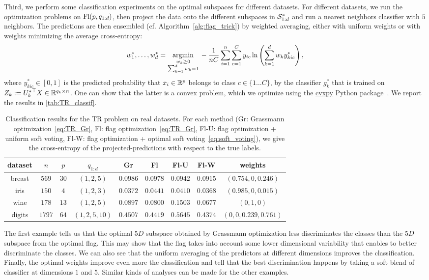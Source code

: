 Third, we perform some classification experiments on the optimal subspaces for different datasets. For different datasets, we run the optimization problems on $\Fl(p, q_{1:d})$, then project the data onto the different subspaces in $\S_{1:d}^*$ and run a nearest neighbors classifier with $5$ neighbors.
The predictions are then ensembled (cf. Algorithm~\ref{alg:flag_trick}) by weighted averaging, either with uniform weights or with weights minimizing the average cross-entropy:
\begin{equation}\label{eq:soft_voting}
	w_1^*, \dots, w_d^* = \argmin{\substack{w_k \geq 0 \\ \sum_{k=1}^d w_k = 1}} - \frac 1 {n C} \sum_{i=1}^n \sum_{c=1}^C y_{ic} \ln\lrp{\sum_{k=1}^d w_k y_{kic}^*},
\end{equation}
where $y_{kic}^* \in [0, 1]$ is the predicted probability that $x_i \in \R^p$ belongs to class $c \in \{1 \dots C\}$, by the classifier $g_k^*$ that is trained on $Z_k := {U_k^*}\T X \in \R^{q_k \times n}$. One can show that the latter is a convex problem, which we optimize using the \href{https://www.cvxpy.org/index.html}{cvxpy} Python package~\citep{diamond2016cvxpy}.
We report the results in \autoref{tab:TR_classif}.
\begin{table}
  \caption{Classification results for the TR problem on real datasets. For each method (Gr: Grassmann optimization~\eqref{eq:TR_Gr}, Fl: flag optimization~\eqref{eq:TR_Gr}, Fl-U: flag optimization + uniform soft voting, Fl-W: flag optimization + optimal soft voting~\eqref{eq:soft_voting}), we give the cross-entropy of the projected-predictions with respect to the true labels.}
  \label{tab:TR_classif}
  \centering
  \begin{tabular}{ccccccccc}
    \toprule
    dataset & $n$ & $p$ & $q_{1:d}$ & Gr & Fl & Fl-U & Fl-W & weights\\
    \midrule
    breast & $569$ & $30$ & $(1, 2, 5)$ & $0.0986$ & $0.0978$ & $0.0942$ & $0.0915$ & $(0.754, 0, 0.246)$\\
    iris & $150$ & $4$ & $(1, 2, 3)$ & $0.0372$ & $0.0441$ & $0.0410$ & $0.0368$ & $(0.985, 0, 0.015)$\\
    wine & $178$ & $13$ & $(1, 2, 5)$ & $0.0897$ & $0.0800$ & $0.1503$ & $0.0677$ & $(0, 1, 0)$\\
    digits & $1797$ & $64$ & $(1, 2, 5, 10)$ & $0.4507$ & $0.4419$ & $0.5645$ & $0.4374$ & $(0, 0, 0.239, 0.761)$\\
    \bottomrule
  \end{tabular}
\end{table}
The first example tells us that the optimal $5D$ subspace obtained by Grassmann optimization less discriminates the classes than the $5D$ subspace from the optimal flag. This may show that the flag takes into account some lower dimensional variability that enables to better discriminate the classes. We can also see that the uniform averaging of the predictors at different dimensions improves the classification. Finally, the optimal weights improve even more the classification and tell that the best discrimination happens by taking a soft blend of classifier at dimensions $1$ and $5$. Similar kinds of analyses can be made for the other examples.


